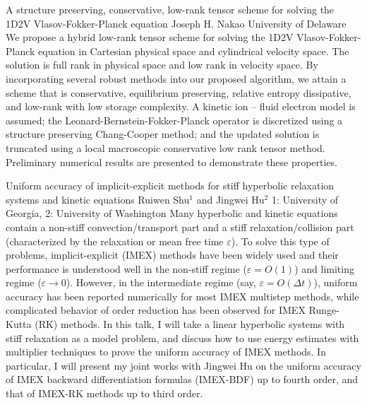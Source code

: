 \begin{addmargin}[2em]{0em}
\vspace{1.5ex}
\abs
{A structure preserving, conservative, low-rank tensor scheme for solving the 1D2V Vlasov-Fokker-Planck equation}
{Joseph H. Nakao}
{University of Delaware}
{We propose a hybrid low-rank tensor scheme for solving the 1D2V Vlasov-Fokker-Planck equation in Cartesian physical space and cylindrical velocity space. The solution is full rank in physical space and low rank in velocity space. By incorporating several robust methods into our proposed algorithm, we attain a scheme that is conservative, equilibrium preserving, relative entropy dissipative, and low-rank with low storage complexity. A kinetic ion -- fluid electron model is assumed; the Leonard-Bernstein-Fokker-Planck operator is discretized using a structure preserving Chang-Cooper method; and the updated solution is truncated using a local macroscopic conservative low rank tensor method. Preliminary numerical results are presented to demonstrate these properties.}

\vspace{1.5ex}
\abs
{Uniform accuracy of implicit-explicit methods for stiff hyperbolic relaxation systems and kinetic equations}
{Ruiwen Shu$^{1}$ and Jingwei Hu$^{2}$}
{1: University of Georgia, 2: University of Washington}
{Many hyperbolic and kinetic equations contain a non-stiff convection/transport part and a stiff relaxation/collision part (characterized by the relaxation or mean free time $\varepsilon$). To solve this type of problems, implicit-explicit (IMEX) methods have been widely used and their performance is understood well in the non-stiff regime ($\varepsilon=O(1)$) and limiting regime ($\varepsilon\rightarrow 0$). However, in the intermediate regime (say, $\varepsilon=O(\Delta t)$), uniform accuracy has been reported numerically for most IMEX multistep methods, while complicated behavior of order reduction has been observed for IMEX Runge-Kutta (RK) methods. In this talk, I will take a linear hyperbolic systems with stiff relaxation as a model problem, and discuss how to use energy estimates with multiplier techniques to prove the uniform accuracy of IMEX methods. In particular, I will present my joint works with Jingwei Hu on the uniform accuracy of IMEX backward differentiation formulas (IMEX-BDF) up to fourth order, and that of IMEX-RK methods up to third order.}
\end{addmargin}
